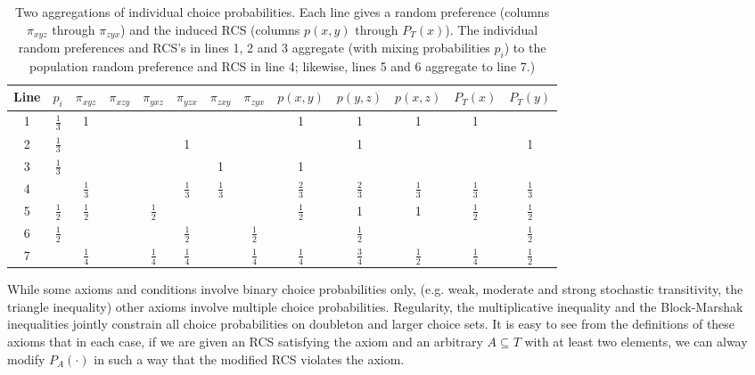\documentclass[11pt,letter]{article}
\begin{document}
\begin{table}
	\centering
	\def\arraystretch{1.4}
	\begin{tabular}{cc|cccccc|ccccc}
		Line & $p_i$ & $\pi_{xyz}$ & $\pi_{xzy}$ & $\pi_{yxz}$ & $\pi_{yzx}$ & $\pi_{zxy}$ & $\pi_{zyx}$
		& $p(x,y)$ & $p(y,z)$ & $p(x,z)$ & $P_T(x)$ & $P_T(y)$ \\
		\hline
		1 & $\frac{1}{3}$ & 1 & & & & & & 1 & 1 & 1 & 1 \\
		2 & $\frac{1}{3}$ & & & & 1 & & & & 1 & & & 1 \\
		3 & $\frac{1}{3}$ & & & & & 1 & & 1 \\
		\hline
		4 & & $\frac{1}{3}$ & & & $\frac{1}{3}$ & $\frac{1}{3}$ & & $\frac{2}{3}$ & $\frac{2}{3}$ & $\frac{1}{3}$  & $\frac{1}{3}$  & $\frac{1}{3}$ \\
		\hline
		5 & $\frac{1}{2}$ & $\frac{1}{2}$ & & $\frac{1}{2}$ & & & & $\frac{1}{2}$ & 1 & 1 & $\frac{1}{2}$ & $\frac{1}{2}$ \\
		6 & $\frac{1}{2}$ & & & & $\frac{1}{2}$ & & $\frac{1}{2}$ & & $\frac{1}{2}$ & & & $\frac{1}{2}$ \\
		\hline
		7 & & $\frac{1}{4}$ & & $\frac{1}{4}$ & $\frac{1}{4}$ & & $\frac{1}{4}$ & $\frac{1}{4}$ & $\frac{3}{4}$ & $\frac{1}{2}$ & $\frac{1}{4}$ & $\frac{1}{2}$ \\
		\hline
	\end{tabular}\caption{Two aggregations of individual choice probabilities.
	Each line gives a random preference (columns $\pi_{xyz}$ through $\pi_{zyx}$) and the induced RCS (columns $p(x,y)$ through $P_T(x)$).
	The individual random preferences and RCS's in lines 1, 2 and 3 aggregate (with mixing probabilities $p_i$) to the population random preference and RCS in line 4; likewise, lines 5 and 6 aggregate to line 7.)}\label{t:notconvex}
\end{table}

While some axioms and conditions involve binary choice probabilities only, (e.g. weak, moderate and strong stochastic transitivity, the triangle inequality) other axioms involve multiple choice probabilities.
Regularity, the multiplicative inequality and the Block-Marshak inequalities jointly constrain all choice probabilities on doubleton and larger choice sets.
It is easy to see from the definitions of these axioms that in each case, if we are given an RCS satisfying the axiom and an arbitrary $A \subseteq T$ with at least two elements, we can alway modify $P_A(\cdot)$ in such a way that the modified RCS violates the axiom.
\end{document}
